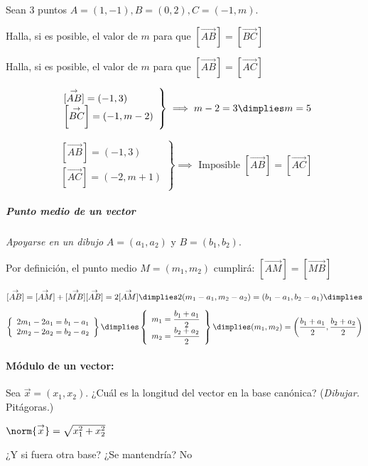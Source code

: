 \documentclass[palatino,nosec]{Docencia}
\renewcommand{\vec}[1]{\overset{\rightarrow}{#1}}
\begin{document}
\begin{problem}
Sean 3 puntos $A=(1,-1), B=(0,2), C=(-1,m)$.

\ppart Halla, si es posible, el valor de $m$ para que $[\vec{AB}] = [\vec{BC}]$

\ppart Halla, si es posible, el valor de $m$ para que $[\vec{AB}] = [\vec{AC}]$

\solution

\spart 
\[
\left.\begin{array}{l}
	[\vec{AB}] = (-1,3)\\
	\left[\vec{BC}\right] = (-1,m-2)
\end{array}\right\} \implies m-2=3 \dimplies m=5
\]

\spart 
\[
\left.\begin{array}{l}
	[\vec{AB}] = (-1,3)\\
	\left[\vec{AC}\right] = (-2,m+1)
\end{array}\right\} \implies \text{ Imposible } [\vec{AB}] = [\vec{AC}]
\]


\end{problem}

\subparagraph{Punto medio de un vector} \textit{Apoyarse en un dibujo} $A=(a_1,a_2)$ y $B=(b_1,b_2)$. 

Por definición, el punto medio $M=(m_1,m_2)$ cumplirá: $[\vec{AM}] = [\vec{MB}]$

\[
[\vec{AB}] = [\vec{AM}] + [\vec{MB}]
[\vec{AB}] = 2[\vec{AM}] \dimplies 
2(m_1-a_1,m_2-a_2) = (b_1-a_1,b_2-a_1) \dimplies
\]
\[
\left\{
	\begin{array}{c}
	2m_1-2a_1 = b_1-a_1\\
	2m_2-2a_2 = b_2-a_2
	\end{array}
\right\}\dimplies
\left\{
	\begin{array}{c}
	m_1 = \displaystyle\frac{b_1+a_1}{2}\\
	m_2 = \displaystyle\frac{b_2+a_2}{2}
	\end{array}
\right\}
\dimplies (m_1,m_2) = \left(\frac{b_1+a_1}{2},\frac{b_2+a_2}{2}\right)
\]


\paragraph{Módulo de un vector:} Sea $\vec{x} = (x_1,x_2)$. ¿Cuál es la longitud del vector en la base canónica? (\textit{Dibujar.} Pitágoras.)

$\norm{\vec{x}} = \sqrt{x_1^2+x_2^2}$

¿Y si fuera otra base? ¿Se mantendría? No
\end{document}
